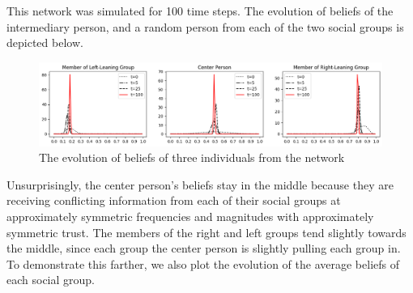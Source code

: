 \documentclass[11pt]{article}
\begin{document}
This network was simulated for 100 time steps. The evolution of beliefs of the intermediary person, and a random person from each of the two social groups is depicted below.

\begin{figure}[h]
    \centering
    \includegraphics[scale=0.53]{images/two_social_groups_individual_beliefs.png}
    \caption{The evolution of beliefs of three individuals from the network}
\end{figure}

Unsurprisingly, the center person's beliefs stay in the middle because they are receiving conflicting information from each of their social groups at approximately symmetric frequencies and magnitudes with approximately symmetric trust. The members of the right and left groups tend slightly towards the middle, since each group the center person is slightly pulling each group in. To demonstrate this farther, we also plot the evolution of the average beliefs of each social group.
\end{document}
